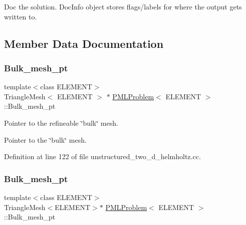 Doc the solution. Doc\+Info object stores flags/labels for where the output gets written to. 



\subsection{Member Data Documentation}
\mbox{\label{classPMLProblem_ac8e72d9422ee75522ee98e617dd7e8ae}} 
\subsubsection{\texorpdfstring{Bulk\+\_\+mesh\+\_\+pt}{Bulk\_mesh\_pt}\hspace{0.1cm}{\footnotesize\ttfamily [1/2]}}
{\footnotesize\ttfamily template$<$class E\+L\+E\+M\+E\+NT$>$ \\
Triangle\+Mesh$<$ E\+L\+E\+M\+E\+NT $>$ $\ast$ \hyperlink{classPMLProblem}{P\+M\+L\+Problem}$<$ E\+L\+E\+M\+E\+NT $>$\+::Bulk\+\_\+mesh\+\_\+pt\hspace{0.3cm}{\ttfamily [private]}}



Pointer to the refineable \char`\"{}bulk\char`\"{} mesh. 

Pointer to the \char`\"{}bulk\char`\"{} mesh. 

Definition at line 122 of file unstructured\+\_\+two\+\_\+d\+\_\+helmholtz.\+cc.

\mbox{\label{classPMLProblem_a712cffd454213a1eca6d98bd2f0f7e4e}} 
\subsubsection{\texorpdfstring{Bulk\+\_\+mesh\+\_\+pt}{Bulk\_mesh\_pt}\hspace{0.1cm}{\footnotesize\ttfamily [2/2]}}
{\footnotesize\ttfamily template$<$class E\+L\+E\+M\+E\+NT$>$ \\
Triangle\+Mesh$<$E\+L\+E\+M\+E\+NT$>$$\ast$ \hyperlink{classPMLProblem}{P\+M\+L\+Problem}$<$ E\+L\+E\+M\+E\+NT $>$\+::Bulk\+\_\+mesh\+\_\+pt\hspace{0.3cm}{\ttfamily [private]}}



